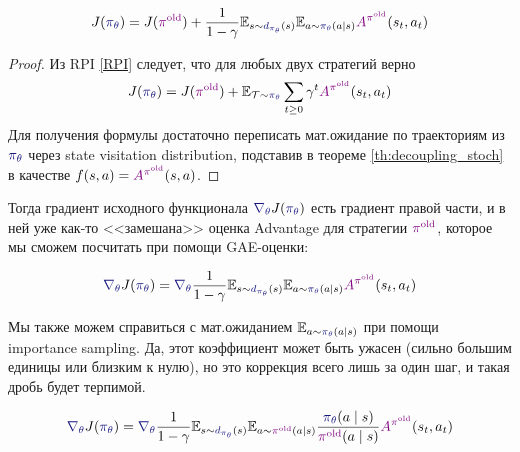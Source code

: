 \begin{proposition}
\,
\begin{equation}\label{RPIdecoupled}
J(\textcolor{ChadBlue}{\pi_{\theta}}) = J(\textcolor{ChadPurple}{\pi^{\old}}) + \frac{1}{1 - \gamma}\E_{s \sim \textcolor{ChadBlue}{d_{\pi_{\theta}}}(s)} \E_{a \sim \textcolor{ChadBlue}{\pi_{\theta}}(a \mid s)} \textcolor{ChadPurple}{A^{\pi^{\old}}}(s_t, a_t)
\end{equation}
\begin{proof}
Из RPI \eqref{RPI} следует, что для любых двух стратегий верно 
$$J(\textcolor{ChadBlue}{\pi_{\theta}}) = J(\textcolor{ChadPurple}{\pi^{\old}}) + \E_{\Traj \sim \textcolor{ChadBlue}{\pi_{\theta}}} \sum_{t \ge 0} \gamma^t \textcolor{ChadPurple}{A^{\pi^{\old}}}(s_t, a_t)$$
Для получения формулы достаточно переписать мат.ожидание по траекториям из $\textcolor{ChadBlue}{\pi_{\theta}}$ через state visitation distribution, подставив в теореме \ref{th:decoupling_stoch} в качестве $f(s, a) \HM= \textcolor{ChadPurple}{A^{\pi^{\old}}}(s, a)$.
\end{proof}
\end{proposition}

Тогда градиент исходного функционала $\textcolor{ChadBlue}{\nabla_\theta} J(\textcolor{ChadBlue}{\pi_{\theta}})$ есть градиент правой части, и в ней уже как-то <<замешана>> оценка Advantage для стратегии $\textcolor{ChadPurple}{\pi^{\old}}$, которое мы сможем посчитать при помощи GAE-оценки:

$$\textcolor{ChadBlue}{\nabla_\theta} J(\textcolor{ChadBlue}{\pi_{\theta}}) = \textcolor{ChadBlue}{\nabla_\theta} \frac{1}{1 - \gamma}\E_{s \sim \textcolor{ChadBlue}{d_{\pi_{\theta}}}(s)} \E_{a \sim \textcolor{ChadBlue}{\pi_{\theta}}(a \mid s)} \textcolor{ChadPurple}{A^{\pi^{\old}}}(s_t, a_t)$$

Мы также можем справиться с мат.ожиданием $\E_{a \sim \textcolor{ChadBlue}{\pi_{\theta}}(a \mid s)}$ при помощи importance sampling. Да, этот коэффициент может быть ужасен (сильно большим единицы или близким к нулю), но это коррекция всего лишь за один шаг, и такая дробь будет терпимой.

\begin{equation}\label{perfectsurrogate}
\textcolor{ChadBlue}{\nabla_\theta} J(\textcolor{ChadBlue}{\pi_{\theta}}) = \textcolor{ChadBlue}{\nabla_\theta} \frac{1}{1 - \gamma} \E_{s \sim \textcolor{ChadBlue}{d_{\pi_{\theta}}}(s)} \E_{a \sim \textcolor{ChadPurple}{\pi^{\old}}(a \mid s)} \frac{\textcolor{ChadBlue}{\pi_{\theta}}(a \mid s)}{\textcolor{ChadPurple}{\pi^{\old}}(a \mid s)} \textcolor{ChadPurple}{A^{\pi^{\old}}}(s_t, a_t)
\end{equation}

